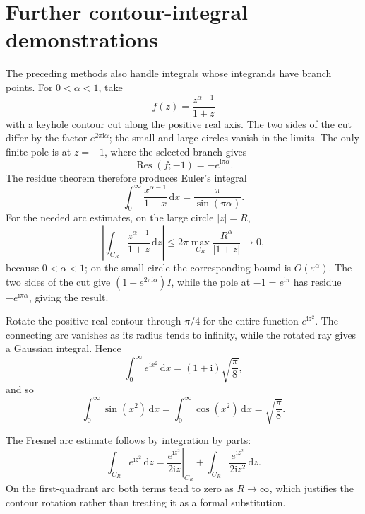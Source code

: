 \section{Further contour-integral demonstrations}

The preceding methods also handle integrals whose integrands have branch points. For $0<\alpha<1$, take
\begin{equation}
f(z)=\frac{z^{\alpha-1}}{1+z}
\end{equation}
with a keyhole contour cut along the positive real axis. The two sides of the cut differ by the factor $e^{2\pi\mathrm{i}\alpha}$; the small and large circles vanish in the limits. The only finite pole is at $z=-1$, where the selected branch gives
\begin{equation}
\operatorname{Res}(f;-1)=-e^{\mathrm{i}\pi\alpha}.
\end{equation}
The residue theorem therefore produces Euler's integral
\begin{equation}
\int_0^\infty\frac{x^{\alpha-1}}{1+x}\,\mathrm{d}x=\frac{\pi}{\sin(\pi\alpha)}.
\end{equation}
For the needed arc estimates, on the large circle $|z|=R$,
\begin{equation}
\left|\int_{C_R}\frac{z^{\alpha-1}}{1+z}\,\mathrm{d}z\right|
\leq2\pi\max_{C_R}\frac{R^\alpha}{|1+z|}\longrightarrow0,
\end{equation}
because $0<\alpha<1$; on the small circle the corresponding bound is $O(\varepsilon^\alpha)$. The two sides of the cut give $(1-e^{2\pi\mathrm{i}\alpha})I$, while the pole at $-1=e^{\mathrm{i}\pi}$ has residue $-e^{\mathrm{i}\pi\alpha}$, giving the result.

\begin{example}
Rotate the positive real contour through $\pi/4$ for the entire function $e^{\mathrm{i}z^2}$. The connecting arc vanishes as its radius tends to infinity, while the rotated ray gives a Gaussian integral. Hence
\begin{equation}
\int_0^\infty e^{\mathrm{i}x^2}\,\mathrm{d}x=(1+\mathrm{i})\sqrt{\frac{\pi}{8}},
\end{equation}
and so
\begin{equation}
\int_0^\infty\sin(x^2)\,\mathrm{d}x=\int_0^\infty\cos(x^2)\,\mathrm{d}x=\sqrt{\frac{\pi}{8}}.
\end{equation}
\end{example}

The Fresnel arc estimate follows by integration by parts:
\begin{equation}
\int_{C_R}e^{\mathrm{i}z^2}\,\mathrm{d}z=
\left.\frac{e^{\mathrm{i}z^2}}{2\mathrm{i}z}\right|_{C_R}
+\int_{C_R}\frac{e^{\mathrm{i}z^2}}{2\mathrm{i}z^2}\,\mathrm{d}z.
\end{equation}
On the first-quadrant arc both terms tend to zero as $R\to\infty$, which justifies the contour rotation rather than treating it as a formal substitution.


